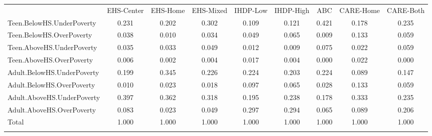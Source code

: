 \begin{tabular}{lcccccccc}
\hline \noalign{\smallskip} & EHS-Center & EHS-Home & EHS-Mixed & IHDP-Low & IHDP-High & ABC & CARE-Home & CARE-Both\\
\noalign{\smallskip}\hline \noalign{\smallskip}Teen.BelowHS.UnderPoverty & 0.231 & 0.202 & 0.302 & 0.109 & 0.121 & 0.421 & 0.178 & 0.235\\
Teen.BelowHS.OverPoverty & 0.038 & 0.010 & 0.034 & 0.049 & 0.065 & 0.009 & 0.133 & 0.059\\
Teen.AboveHS.UnderPoverty & 0.035 & 0.033 & 0.049 & 0.012 & 0.009 & 0.075 & 0.022 & 0.059\\
Teen.AboveHS.OverPoverty & 0.006 & 0.002 & 0.004 & 0.017 & 0.004 & 0.000 & 0.022 & 0.000\\
Adult.BelowHS.UnderPoverty & 0.199 & 0.345 & 0.226 & 0.224 & 0.203 & 0.224 & 0.089 & 0.147\\
Adult.BelowHS.OverPoverty & 0.010 & 0.023 & 0.018 & 0.097 & 0.065 & 0.028 & 0.133 & 0.059\\
Adult.AboveHS.UnderPoverty & 0.397 & 0.362 & 0.318 & 0.195 & 0.238 & 0.178 & 0.333 & 0.235\\
Adult.AboveHS.OverPoverty & 0.083 & 0.023 & 0.049 & 0.297 & 0.294 & 0.065 & 0.089 & 0.206\\
Total & 1.000 & 1.000 & 1.000 & 1.000 & 1.000 & 1.000 & 1.000 & 1.000\\
\noalign{\smallskip}\hline\end{tabular}\\
